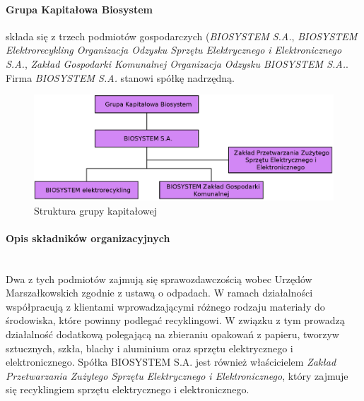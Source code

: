 

\paragraph{Grupa Kapitałowa Biosystem} składa się z trzech podmiotów gospodarczych (\emph{BIOSYSTEM S.A.}, \emph{BIOSYSTEM Elektrorecykling Organizacja Odzysku Sprzętu Elektrycznego i Elektronicznego S.A.}, \emph{Zakład Gospodarki Komunalnej Organizacja Odzysku BIOSYSTEM S.A.}. Firma \emph{BIOSYSTEM S.A.} stanowi spółkę nadrzędną.

\begin{figure}[H]
	\centering
	\includegraphics[width=\textwidth]{img/group_chart.eps}
	\caption{Struktura grupy kapitałowej}
\end{figure}

\paragraph{Opis składników organizacyjnych} \ \\
Dwa z tych podmiotów zajmują się sprawozdawczością wobec Urzędów Marszałkowskich zgodnie z ustawą o odpadach.
W ramach działalności współpracują z klientami wprowadzającymi różnego rodzaju materiały do środowiska, które powinny podlegać recyklingowi.
W związku z tym prowadzą działalność dodatkową polegającą na zbieraniu opakowań z papieru, tworzyw sztucznych, szkła, blachy i aluminium oraz sprzętu elektrycznego i elektronicznego.
Spółka BIOSYSTEM S.A. jest również właścicielem \emph{Zakład Przetwarzania Zużytego Sprzętu Elektrycznego i Elektronicznego}, który zajmuje się recyklingiem sprzętu elektrycznego i elektronicznego. 

